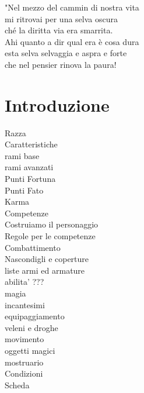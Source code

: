 \documentclass[12pt,a4paper,twoside,openany]{book}
\begin{document}

\pagebreak

\setcounter{page}{1}

\begin{multicols}{2}
{\small \tableofcontents{}}

\end{multicols}

\vfill

\begin{changemargin}{0.3cm}{0.3cm}\begin{tcolorbox}
"Nel mezzo del cammin di nostra vita\\
mi ritrovai per una selva oscura\\
ché la diritta via era smarrita.\\
Ahi quanto a dir qual era è cosa dura\\
esta selva selvaggia e aspra e forte\\
che nel pensier rinova la paura!\\
\end{tcolorbox}\end{changemargin}

\pagebreak

\section{Introduzione}
Razza\\
Caratteristiche\\
rami base\\
rami avanzati\\
Punti Fortuna\\
Punti Fato\\
Karma\\
Competenze\\
Costruiamo il personaggio\\
Regole per le competenze\\
Combattimento\\
Nascondigli e coperture\\
liste armi ed armature\\
abilita' ???\\
magia\\
incantesimi\\
equipaggiamento\\
veleni e droghe\\
movimento\\
oggetti magici\\
mostruario\\
Condizioni\\
Scheda\\
\end{document}
